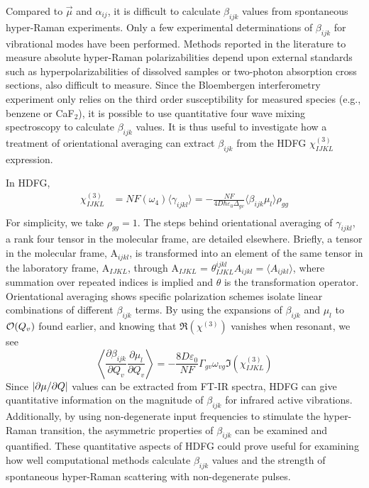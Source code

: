 \documentclass[aip, jcp, reprint, twocolumn]{revtex4-2}
\begin{document}
Compared to $\vec{\mu}$ and $\alpha_{ij}$, it is difficult to calculate $\beta_{ijk}$ values from spontaneous hyper-Raman experiments. \cite{Kelley2010}
Only a few experimental determinations of $\beta_{ijk}$ for vibrational modes have been performed. \cite{Xu1997, Shoute2005, Kelley2010}
Methods reported in the literature to measure absolute hyper-Raman polarizabilities depend upon external standards such as hyperpolarizabilities of dissolved samples or two-photon absorption cross sections, also difficult to measure. \cite{Okuno2020}
Since the Bloembergen interferometry experiment only relies on the third order susceptibility for measured species (e.g., benzene or CaF$_2$),\cite{Levenson1974_2} it is possible to use quantitative four wave mixing spectroscopy to calculate $\beta_{ijk}$ values.
It is thus useful to investigate how a treatment of orientational averaging can extract $\beta_{ijk}$ from the HDFG $\chi^{(3)}_{IJKL}$ expression.

In HDFG, 
\begin{equation}\label{chi3}
\begin{split}
		\chi^{(3)}_{IJKL} &= NF(\omega_4) \langle \gamma_{ijkl} \rangle = -\frac{NF}{4D \hbar \varepsilon_0 \Delta_{gv}} \langle \beta_{ijk} \mu_l \rangle \rho_{gg}\\
\end{split}
\end{equation}
For simplicity, we take $\rho_{gg} = 1$.
The steps behind orientational averaging of $\gamma_{ijkl}$, a rank four tensor in the molecular frame, are detailed elsewhere.\cite{Andrews1977, McDonnell2024}
Briefly, a tensor in the molecular frame, A$_{ijkl}$, is transformed into an element of the same tensor in the laboratory frame, A$_{IJKL}$, through A$_{IJKL}$ = $\theta^{ijkl}_{IJKL} A_{ijkl} = \langle A_{ijkl} \rangle$, where summation over repeated indices is implied and $\theta$ is the transformation operator. \cite{McDonnell2024}
Orientational averaging shows specific polarization schemes isolate linear combinations of different $\beta_{ijk}$ terms. \cite{Bersohn1966, Willetts1992, Kauranen1996}
By using the expansions of $\beta_{ijk}$ and $\mu_{l}$ to $\order{Q_v}$ found earlier, and knowing that $\Re(\chi^{(3)})$ vanishes when resonant, we see
\begin{equation}\label{betasive}
	\left\langle \frac{\partial \beta_{ijk}}{\partial Q_v} {\frac{\partial \mu_l}{\partial Q_v}} \right\rangle = -\frac{8D \varepsilon_0}{NF}  {\Gamma_{gv} \omega_{vg}} {\Im(\chi^{(3)}_{IJKL})}
\end{equation}
Since $\abs{\partial \mu / \partial Q}$ values can be extracted from FT-IR spectra,\cite{RN459} HDFG can give quantitative information on the magnitude of $\beta_{ijk}$ for infrared active vibrations.
Additionally, by using non-degenerate input frequencies to stimulate the hyper-Raman transition, the asymmetric properties of $\beta_{ijk}$ can be examined and quantified. \cite{Christie1971, Denisov1986, Kozich2007}
These quantitative aspects of HDFG could prove useful for examining how well computational methods calculate $\beta_{ijk}$ values and the strength of spontaneous hyper-Raman scattering with non-degenerate pulses.
\end{document}
